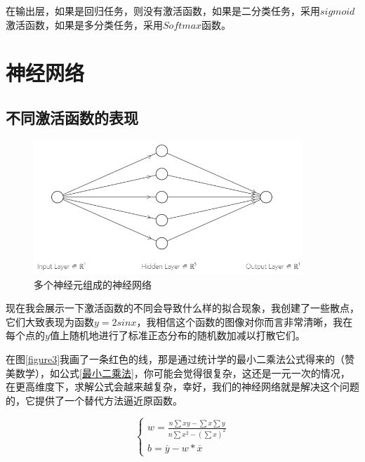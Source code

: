 \documentclass[a5paper, 11pt]{ctexbook}
\begin{document}
在输出层，如果是回归任务，则没有激活函数，如果是二分类任务，采用$sigmoid$激活函数，如果是多分类任务，采用$Softmax$函数。


\chapter{神经网络} \label{神经网络章节}

\section{不同激活函数的表现}

\begin{figure}[ht]
    \centering
    \includegraphics[width=0.9\textwidth]{figures/神经网络.png}
    \caption{多个神经元组成的神经网络}
    \label{figure2}
\end{figure}

现在我会展示一下激活函数的不同会导致什么样的拟合现象，我创建了一些散点，它们大致表现为函数$y=2sinx$，我相信这个函数的图像对你而言非常清晰，我在每个点的$y$值上随机地进行了标准正态分布的随机数加减以打散它们。

在图\ref{figure3}我画了一条红色的线，那是通过统计学的最小二乘法公式得来的（赞美数学），如公式\ref{最小二乘法}，你可能会觉得很复杂，这还是一元一次的情况，在更高维度下，求解公式会越来越复杂，幸好，我们的神经网络就是解决这个问题的，它提供了一个替代方法逼近原函数。

\begin{equation}
    \begin{cases}
        w = \frac{n\sum{xy}-\sum{x}\sum{y}}{n\sum{x}^2-(\sum{x})^2} \\
        b = \overline{y} - w * \overline{x}
    \end{cases}
    \label{最小二乘法}
\end{equation}
\end{document}
